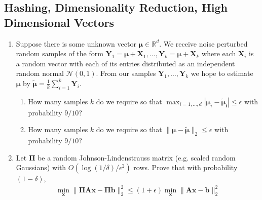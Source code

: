 \documentclass[10pt]{article}
\newcommand{\bs}[1]{\boldsymbol{#1}}
\newcommand{\bv}[1]{\mathbf{#1}}
\newcommand{\R}{\mathbb{R}}
\begin{document}
	\subsection{Hashing, Dimensionality Reduction, High Dimensional Vectors}
	\begin{enumerate}
		\item Suppose there is some unknown vector $\bs{\mu} \in \R^d$. We receive noise perturbed random samples of the form $\bv{Y}_1 = \bs{\mu} + \bv{X}_1, \ldots, \bv{Y}_k = \bs{\mu} + \bv{X}_k$ where each $\bv{X}_i$ is a random vector with each of its entries distributed as an independent random normal $\mathcal{N}(0,1)$. From our samples $\bv{Y}_1, \ldots, \bv{Y}_k$ we hope to estimate $\bs{\mu}$ by $\bs{\tilde{\mu}} = \frac{1}{k}\sum_{i=1}^k \bv{Y}_i$. 
		\begin{enumerate}
			\item How many samples $k$ do we require so that $\max_{i=1,\ldots, d}|\bs{\mu}_i -\bs{\tilde{\mu}_i} | \leq \epsilon$ with probability $9/10$?
			\item How many samples $k$ do we require so that $\|\bs{\mu} -\bs{\tilde{\mu}}\|_2 \leq \epsilon$ with probability $9/10$?
		\end{enumerate}
		\item Let $\bs{\Pi}$ be a random Johnson-Lindenstrauss matrix (e.g. scaled random Gaussians) with $O(\log(1/\delta)/\epsilon^2)$ rows. Prove that with probability $(1-\delta)$,
		\begin{align*}
			\min_{\bv{x}} \|\bs{\Pi}\bv{A}\bv{x} - \bs{\Pi}\bv{b}\|_2^2 \leq (1+\epsilon) \min_{\bv{x}} \|\bv{A}\bv{x} - \bv{b}\|_2^2 
		\end{align*}
	\end{enumerate}
	
	
	
	
\end{document}
